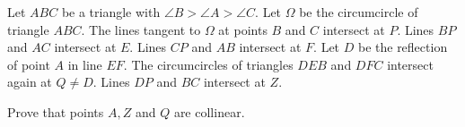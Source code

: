 Let $ABC$ be a triangle with $\angle B>\angle A>\angle C$. Let $\Omega$ be the circumcircle of triangle $ABC$. The lines tangent to $\Omega$ at points $B$ and $C$ intersect at $P$. Lines $BP$ and $AC$ intersect at $E$. Lines $CP$ and $AB$ intersect at $F$. Let $D$ be the reflection of point $A$ in line $EF$. The circumcircles of triangles $DEB$ and $DFC$ intersect again at $Q\neq D$. Lines $DP$ and $BC$ intersect at $Z$.

Prove that points $A,Z$ and $Q$ are collinear.
